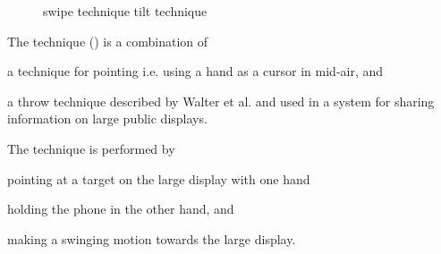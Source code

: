 \begin{figure}
\caption{
	\protect{} swipe technique
	\protect{} tilt technique
}
\label{fig:swipeTilt}
\end{figure}

The \throw technique () is a combination of  
\begin{enumerate*}[label=\itshape\alph*\upshape)]
	\item{a technique for pointing \cite{Scheible:2008} i.e. using a hand as a cursor in mid-air, and}
	\item{a throw technique described by Walter et al. \cite{Walter:2014} and used in a system for sharing information on large public displays.}
\end{enumerate*}
The \throw technique is performed by 
\begin{enumerate*}[label=\itshape\arabic*\upshape)]
	\item{pointing at a target on the large display with one hand} 
	\item{holding the phone in the other hand, and}
	\item{making a swinging motion towards the large display.}
\end{enumerate*}

